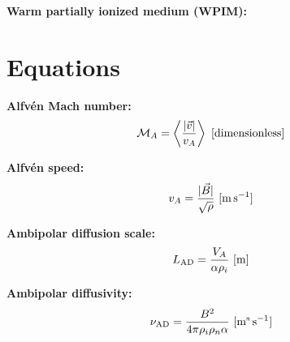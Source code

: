 \documentclass[a4paper,10pt]{article}
\begin{document}
{\noindent}\textbf{Warm partially ionized medium (WPIM):} 





















































\newpage
\section{Equations}

{\noindent}\textbf{Alfv\'en Mach number:}
\begin{align*}
    \mathcal{M}_A = \left\langle\frac{\lvert\vec{v}\rvert}{v_A}\right\rangle ~ [{\rm dimensionless}]
\end{align*}

{\noindent}\textbf{Alfv\'en speed:}
\begin{align*}
    v_A = \frac{\lvert\vec{B}\lvert}{\sqrt{\rho}} ~ [{\rm m\,s^{-1}}]
\end{align*}

{\noindent}\textbf{Ambipolar diffusion scale:}
\begin{align*}
    L_\mathrm{AD} = \dfrac{V_A}{\alpha\rho_i} ~ [\rm m]
\end{align*}

{\noindent}\textbf{Ambipolar diffusivity:}
\begin{align*}
    \nu_\mathrm{AD} = \dfrac{B^2}{4\pi\rho_i\rho_n\alpha} ~ [{\rm m^s\,s^{-1}}]
\end{align*}
\end{document}
